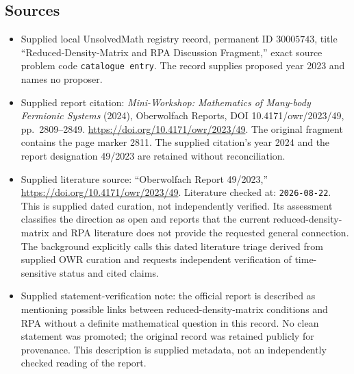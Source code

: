 \documentclass[11pt]{article}
\begin{document}
\subsection{Sources}
\begin{itemize}
\item Supplied local UnsolvedMath registry record, permanent ID \(30005743\), title ``Reduced-Density-Matrix and RPA Discussion Fragment,'' exact source problem code \texttt{catalogue entry}. The record supplies proposed year 2023 and names no proposer.
\item Supplied report citation: \emph{Mini-Workshop: Mathematics of Many-body Fermionic Systems} (2024), Oberwolfach Reports, DOI 10.4171/owr/2023/49, pp.\ 2809--2849. \url{https://doi.org/10.4171/owr/2023/49}. The original fragment contains the page marker 2811. The supplied citation's year 2024 and the report designation 49/2023 are retained without reconciliation.
\item Supplied literature source: ``Oberwolfach Report 49/2023,'' \url{https://doi.org/10.4171/owr/2023/49}. Literature checked at: \texttt{2026-08-22}. This is supplied dated curation, not independently verified. Its assessment classifies the direction as open and reports that the current reduced-density-matrix and RPA literature does not provide the requested general connection. The background explicitly calls this dated literature triage derived from supplied OWR curation and requests independent verification of time-sensitive status and cited claims.
\item Supplied statement-verification note: the official report is described as mentioning possible links between reduced-density-matrix conditions and RPA without a definite mathematical question in this record. No clean statement was promoted; the original record was retained publicly for provenance. This description is supplied metadata, not an independently checked reading of the report.
\end{itemize}
\end{document}
